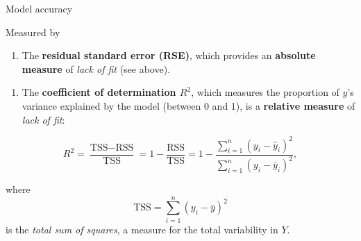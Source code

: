 \documentclass[10pt,ignorenonframetext,]{beamer}
\providecommand{\tightlist}{%
  \setlength{\itemsep}{0pt}\setlength{\parskip}{0pt}}
\begin{document}
\begin{frame}{Model accuracy}

Measured by

\begin{enumerate}
\def\labelenumi{\arabic{enumi}.}
\tightlist
\item
  The \textbf{residual standard error (RSE)}, which provides an
  \textbf{absolute measure} of \emph{lack of fit} (see above).
\end{enumerate}

\vspace{2mm}

\begin{enumerate}
\def\labelenumi{\arabic{enumi}.}
\setcounter{enumi}{1}
\tightlist
\item
  The \textbf{coefficient of determination \(R^2\)}, which measures the
  proportion of \(y\)'s variance explained by the model (between 0 and
  1), is a \textbf{relative measure} of \emph{lack of fit}:
\end{enumerate}

\[R^2 = \frac{\text{TSS}-\text{RSS}}{\text{TSS}}= 1-\frac{\text{RSS}}{\text{TSS}}=1-\frac{\sum_{i=1}^n(y_i-\hat{y}_i)^2}{\sum_{i=1}^n(y_i-\bar{y}_i)^2}, \]

where \[\text{TSS} = \sum_{i=1}^n (y_i - \bar{y})^2\] is the \emph{total
sum of squares}, a measure for the total variability in \(Y\).

\end{frame}
\end{document}
